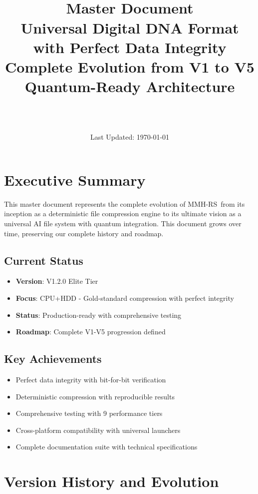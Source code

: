 \documentclass[12pt,a4paper]{article}
\title{\Huge\textbf{\project\ \version}\\[0.5cm]
\Large\textbf{Master Document}\\[0.3cm]
\large Universal Digital DNA Format with Perfect Data Integrity\\[0.5cm]
\large Complete Evolution from V1 to V5\\[0.3cm]
\large Quantum-Ready Architecture}
\author{\Large\authorname\\[0.2cm]\email\\[0.2cm]\github}
\date{\large Last Updated: \today}
\newcommand{\version}{V1.2.0 Elite Tier}
\newcommand{\project}{MMH-RS}
\begin{document}
\maketitle
\thispagestyle{empty}

\tableofcontents
\newpage

\section{Executive Summary}

This master document represents the complete evolution of \project\ from its inception as a deterministic file compression engine to its ultimate vision as a universal AI file system with quantum integration. This document grows over time, preserving our complete history and roadmap.

\subsection{Current Status}
\begin{itemize}
    \item \textbf{Version}: \version
    \item \textbf{Focus}: CPU+HDD - Gold-standard compression with perfect integrity
    \item \textbf{Status}: Production-ready with comprehensive testing
    \item \textbf{Roadmap}: Complete V1-V5 progression defined
\end{itemize}

\subsection{Key Achievements}
\begin{itemize}
    \item Perfect data integrity with bit-for-bit verification
    \item Deterministic compression with reproducible results
    \item Comprehensive testing with 9 performance tiers
    \item Cross-platform compatibility with universal launchers
    \item Complete documentation suite with technical specifications
\end{itemize}

\newpage

\section{Version History and Evolution}
\end{document}
